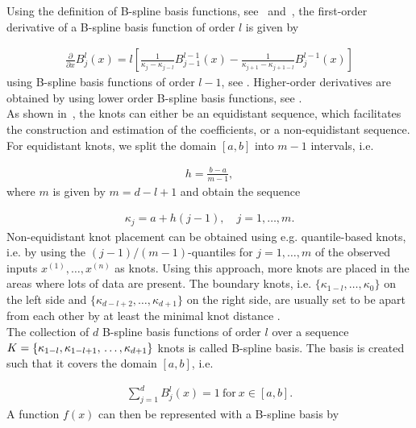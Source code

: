 Using the definition of B-spline basis functions, see~ and~, the first-order derivative of a B-spline basis function of order $l$ is given by

\begin{align} \label{eq:Bspline-bf-derivative}
	\frac{\partial}{\partial x} B_j^l(x) = l \left[\frac{1}{\kappa_j - \kappa_{j-l}} B_{j-1}^{l-1}(x) - \frac{1}{\kappa_{j+1} - \kappa_{j+1-l}} B_j^{l-1}(x) \right]
\end{align}
%
using B-spline basis functions of order $l-1$, see \cite{fahrmeir2007regression}. Higher-order derivatives are obtained by using lower order B-spline basis functions, see \cite{deBoor1978practicalGuideToSplines}. \\

As shown in~, the knots can either be an equidistant sequence, which facilitates the construction and estimation of the coefficients, or a non-equidistant sequence. For equidistant knots, we split the domain $[a,b]$ into $m-1$ intervals, i.e.

\begin{align} \label{eq:equidistant-knots-interval}
	h = \frac{b - a} {m - 1},
\end{align}
%
where $m$ is given by $m = d - l + 1$ and obtain the sequence

\begin{align} \label{eq:equidistant-knots-sequence}
	\kappa_j = a + h(j-1), \quad j=1, \dots, m.
\end{align} 
%
Non-equidistant knot placement can be obtained using e.g. quantile-based knots, i.e. by using the $(j-1)/(m-1)$-quantiles for $j=1, \dots, m$ of the observed inputs $x^{(1)}, \dots, x^{(n)}$ as knots. Using this approach, more knots are placed in the areas where lots of data are present. The boundary knots, i.e. $\{\kappa_{1-l}, \dots, \kappa_0\}$ on the left side and $\{\kappa_{d-l+2}, \dots, \kappa_{d+1}\}$ on the right side, are usually set to be apart from each other by at least the minimal knot distance \cite{fahrmeir2007regression}. \\

The collection of $d$ B-spline basis functions of order $l$ over a sequence $K = \{\kappa_{1-l}, \kappa_{1-l+1}, \\ \dots, \kappa_{d+1}\}$ knots is called B-spline basis. The basis is created such that it covers the domain $[a, b]$, i.e.

\begin{align}
	\sum_{j=1}^d B_j^l(x) = 1 \ \text{for} \ x \in [a,b].
\end{align}
%
A function $f(x)$ can then be represented with a B-spline basis by 

